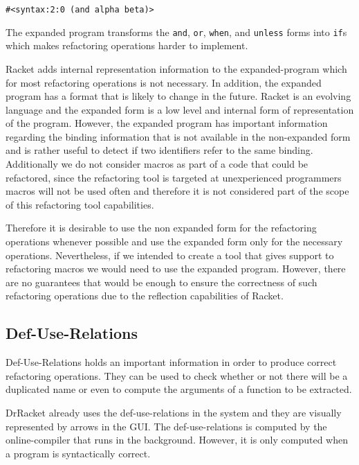 \begin{lstlisting}[basicstyle=\ttfamily, caption=Non-expanded program]
#<syntax:2:0 (and alpha beta)>
\end{lstlisting}


The expanded program transforms the {\tt and}, {\tt or}, {\tt when}, and {\tt unless} forms into
{\tt if}s which makes refactoring operations harder to implement.

Racket adds internal representation information to the expanded-program which for
most refactoring operations is not necessary.
In addition, the expanded program has a format that is likely to change
in the future.
Racket is an evolving language and the expanded form is a low level and internal
form of representation of the program.
However, the expanded program has important information regarding the binding
information that is not available in the non-expanded form and is rather useful
to detect if two identifiers refer to the same binding.
Additionally we do not consider macros as part of a code that could be refactored,
 since the refactoring tool is targeted at unexperienced programmers macros
will not be used often and therefore it is not considered part of the scope of
this refactoring tool capabilities.

Therefore it is desirable to use the non expanded form for the refactoring %
operations whenever possible and use the expanded form only for the necessary
operations.
Nevertheless, if we intended to create a tool that gives support to refactoring macros
we would need to use the expanded program.
However, there are no guarantees that would be enough to ensure the correctness of
such refactoring operations due to the reflection capabilities of Racket.


\subsection{Def-Use-Relations}
Def-Use-Relations holds an important information in order to produce correct refactoring operations.
They can be used to check whether or not there will be a duplicated name
or even to compute the arguments of a function to be extracted.

DrRacket already uses the def-use-relations in the system and they are visually  %
represented by arrows in the GUI.
The def-use-relations is computed by the online-compiler that runs in the background.
However, it is only computed when a program is syntactically correct.

